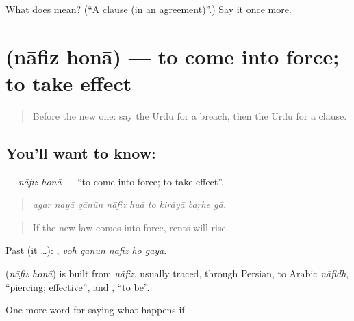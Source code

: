 \begin{tcolorbox}[breakable,colback=teal!4,colframe=teal!35!black,title={Before you move on}]
What does  mean? (\textquotedblleft{}A clause (in an agreement)\textquotedblright{}.) Say it once more.
\end{tcolorbox}
\section[\texorpdfstring{\ur{نافذ} \ur{ہونا} (nāfiz honā)}{نافذ ہونا (nāfiz honā)}]{  (nāfiz honā) — to come into force; to take effect}

\label{lesson:UR-C367-nafiz-hona}



\begin{quote}
Before the new one: say the Urdu for a breach, then the Urdu for a clause.
\end{quote}

\subsection*{You'll want to know:  }
\textbf{ } — \emph{nāfiz honā} — \textquotedblleft{}to come into force; to take effect\textquotedblright{}.

\begin{quote}
        
\end{quote}

\begin{quote}
\emph{agar nayā qānūn nāfiz huā to kirāyā baṛhe gā.}
\end{quote}

\begin{quote}
If the new law comes into force, rents will rise.
\end{quote}

Past (it …):     , \emph{voh qānūn nāfiz ho gayā}.

\begin{cousinweb}
\textbf{ } (\emph{nāfiz honā}) is built from \emph{nāfiz}, usually traced, through Persian, to Arabic \emph{nāfidh}, \textquotedblleft{}piercing; effective\textquotedblright{}, and \textbf{}, \textquotedblleft{}to be\textquotedblright{}.
\end{cousinweb}

\begin{grammarlens}[title={What you've built}]
One more word for saying what happens if.
\end{grammarlens}


